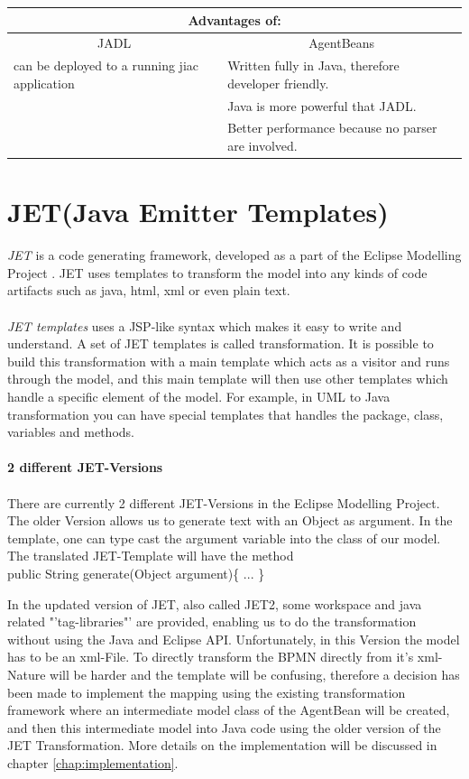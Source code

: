 \begin{tabularx}{\linewidth}{|l|X|}\hline\hline
			\multicolumn{2}{|c|}{\textbf{Advantages of:}} \\\hline
			\multicolumn{1}{|c|}{JADL} & \multicolumn{1}{c|}{AgentBeans}\\\hline
			can be deployed to a running jiac application &  Written fully in Java, therefore developer friendly.\\
																										&  Java is more powerful that JADL.\\
			                           										&  Better performance because no parser are involved.\\\hline\hline
\end{tabularx}


\section{JET(Java Emitter Templates)}
\textit{JET}\cite{13} is a code generating framework, developed as a part of the Eclipse Modelling Project \cite{14}. JET uses templates to transform the model into any kinds of code artifacts such as java, html, xml or even plain text. \\\\
\textit{JET templates} uses a JSP-like syntax which makes it easy to write and understand. A set of JET templates is called transformation. It is possible to build this transformation with a main template which acts as a visitor and runs through the model, and this main template will then use other templates which handle a specific element of the model. For example, in UML to Java transformation you can have special templates that handles the package, class, variables and methods.\\\\

\textbf{2 different JET-Versions}\\\\
There are currently 2 different JET-Versions in the Eclipse Modelling Project. The older Version allows us to generate text with an Object as argument. In the template, one can type cast the argument variable into the class of our model. \\
The translated JET-Template will have the method \\
public String generate(Object argument)\{
...
\}

In the updated version of JET, also called JET2, some workspace and java related "'tag-libraries"' are provided, enabling us to do the transformation without using the Java and Eclipse API. Unfortunately, in this Version the model has to be an xml-File.
To directly transform the BPMN directly from it's xml-Nature will be harder and the template will be confusing, therefore a decision has been made to implement the mapping using the existing transformation framework where an intermediate model class of the AgentBean will be created, and then this intermediate model into Java code using the older version of the JET Transformation.
More details on the implementation will be discussed in chapter \ref{chap:implementation}.